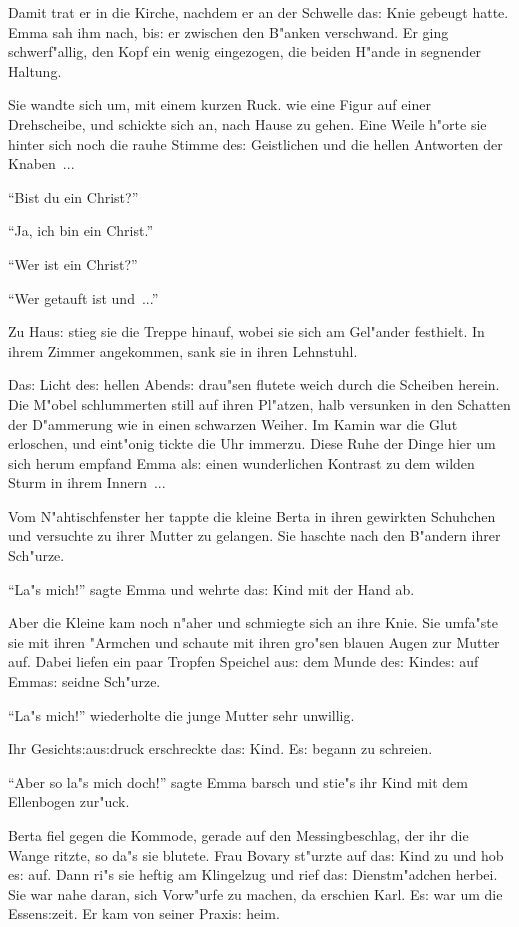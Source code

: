 \documentclass[oneside,12pt]{book}
\newcommand{\s}{s:}%
\begin{document}
Damit trat er in die Kirche, nachdem er an der Schwelle da{\s}
Knie gebeugt hatte. Emma sah ihm nach, bi{\s} er zwischen den
B"anken verschwand. Er ging schwerf"allig, den Kopf ein wenig
eingezogen, die beiden H"ande in segnender Haltung.

Sie wandte sich um, mit einem kurzen Ruck. wie eine Figur auf
einer Drehscheibe, und schickte sich an, nach Hause zu gehen. Eine
Weile h"orte sie hinter sich noch die rauhe Stimme de{\s}
Geistlichen und die hellen Antworten der Knaben~...

"`Bist du ein Christ?"'

"`Ja, ich bin ein Christ."'

"`Wer ist ein Christ?"'

"`Wer getauft ist und~..."'

Zu Hau{\s} stieg sie die Treppe hinauf, wobei sie sich am
Gel"ander festhielt. In ihrem Zimmer angekommen, sank sie in ihren
Lehnstuhl.

Da{\s} Licht de{\s} hellen Abend{\s} drau"sen flutete weich durch
die Scheiben herein. Die M"obel schlummerten still auf ihren
Pl"atzen, halb versunken in den Schatten der D"ammerung wie in
einen schwarzen Weiher. Im Kamin war die Glut erloschen, und
eint"onig tickte die Uhr immerzu. Diese Ruhe der Dinge hier um
sich herum empfand Emma al{\s} einen wunderlichen Kontrast zu dem
wilden Sturm in ihrem Innern~...

Vom N"ahtischfenster her tappte die kleine Berta in ihren
gewirkten Schuhchen und versuchte zu ihrer Mutter zu gelangen. Sie
haschte nach den B"andern ihrer Sch"urze.

"`La"s mich!"' sagte Emma und wehrte da{\s} Kind mit der Hand ab.

Aber die Kleine kam noch n"aher und schmiegte sich an ihre Knie.
Sie umfa"ste sie mit ihren "Armchen und schaute mit ihren gro"sen
blauen Augen zur Mutter auf. Dabei liefen ein paar Tropfen
Speichel au{\s} dem Munde de{\s} Kinde{\s} auf Emma{\s} seidne
Sch"urze.

"`La"s mich!"' wiederholte die junge Mutter sehr unwillig.

Ihr Gesicht{\s}au{\s}druck erschreckte da{\s} Kind. E{\s} begann
zu schreien.

"`Aber so la"s mich doch!"' sagte Emma barsch und stie"s ihr Kind
mit dem Ellenbogen zur"uck.

Berta fiel gegen die Kommode, gerade auf den Messingbeschlag, der
ihr die Wange ritzte, so da"s sie blutete. Frau Bovary st"urzte
auf da{\s} Kind zu und hob e{\s} auf. Dann ri"s sie heftig am
Klingelzug und rief da{\s} Dienstm"adchen herbei. Sie war nahe
daran, sich Vorw"urfe zu machen, da erschien Karl. E{\s} war um
die Essen{\s}zeit. Er kam von seiner Praxi{\s} heim.
\end{document}

